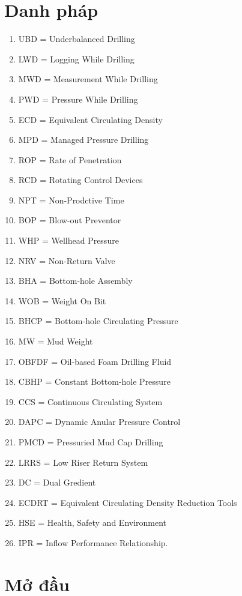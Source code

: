 \documentclass[12pt,a4paper]{article}
\begin{document}
\section*{\textbf{Danh pháp}}
	\begin{enumerate}
		\item[] UBD = Underbalanced Drilling
		\item[] LWD = Logging While Drilling
		\item[] MWD = Measurement While Drilling
		\item[] PWD = Pressure While Drilling
		\item[] ECD = Equivalent Circulating Density
		\item[] MPD = Managed Pressure Drilling
		\item[] ROP = Rate of Penetration 
 		\item[] RCD = Rotating Control Devices
		\item[] NPT = Non-Prodctive Time
		\item[] BOP = Blow-out Preventor
		\item[] WHP = Wellhead Pressure
		\item[] NRV = Non-Return Valve
		\item[] BHA = Bottom-hole Assembly
		\item[] WOB = Weight On Bit
		\item[] BHCP = Bottom-hole Circulating Pressure
		\item[] MW = Mud Weight
		\item[] OBFDF = Oil-based Foam Drilling Fluid
		\item[] CBHP = Constant Bottom-hole Pressure
		\item[] CCS = Continuous Circulating System
 		\item[] DAPC = Dynamic Anular Pressure Control
		\item[] PMCD = Pressuried Mud Cap Drilling
		\item[] LRRS = Low Riser Return System
		\item[] DC = Dual Gredient
		\item[] ECDRT = Equivalent Circulating Density Reduction Tools
	 	\item[] HSE = Health, Safety and Environment
	 	\item[] IPR = Inflow Performance Relationship.
	\end{enumerate}
\clearpage
{}
\newpage
\section{Mở đầu}
\end{document}
